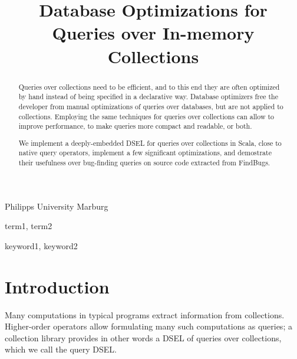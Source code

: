 \documentclass[preprint,authoryear,10pt]{sigplanconf}
\begin{document}
\copyrightdata{[to be supplied]} 


\title{Database Optimizations for Queries over In-memory Collections}

	   {Philipps University Marburg}

\maketitle

\begin{abstract}
Queries over collections need to be efficient, and to this end they are often optimized by hand instead of
being specified in a declarative way. Database optimizers free the developer from manual optimizations of queries
over databases, but are not applied to collections. Employing the same techniques for queries over collections can
allow to improve performance, to make queries more compact and readable, or both.

We implement a deeply-embedded DSEL for queries over collections in Scala, close to native query operators,
implement a few significant optimizations, and demostrate their usefulness over bug-finding queries on source code
extracted from FindBugs.
\end{abstract}


\terms
term1, term2

\keywords
keyword1, keyword2




\section{Introduction}

Many computations in typical programs extract information from
collections. Higher-order operators allow formulating many such
computations as queries; a collection library provides in other words a
DSEL of queries over collections, which we call the query DSEL.
\end{document}

